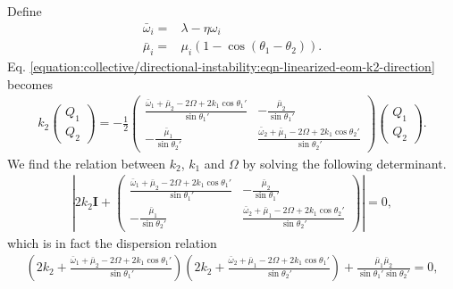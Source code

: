 \documentclass[letterpaper,12pt,english]{sphinxmanual}
\begin{document}
Define
\begin{equation*}
\begin{split}\bar\omega_i =& \lambda - \eta\omega_i\\
\bar\mu_i =& \mu_i(1-\cos(\theta_1-\theta_2)).\end{split}
\end{equation*}
Eq. \eqref{equation:collective/directional-instability:eqn-linearized-eom-k2-direction} becomes
\begin{equation*}
\begin{split}k_2 \begin{pmatrix}
Q_1 \\
Q_2
\end{pmatrix} =-\frac{1}{2}\begin{pmatrix}
\frac{\bar\omega_1 + \bar\mu_2-2\Omega+2k_1\cos\theta_1'}{\sin\theta_1'} & -\frac{\bar\mu_2}{\sin\theta_1'} \\
-\frac{\bar\mu_1}{\sin\theta_2'} & \frac{ \bar\omega_2+\bar\mu_1-2\Omega + 2k_1\cos\theta_2' }{\sin\theta_2'}
\end{pmatrix}\begin{pmatrix}
Q_1 \\
Q_2
\end{pmatrix}.\end{split}
\end{equation*}
We find the relation between \(k_2\), \(k_1\) and \(\Omega\) by solving the following determinant.
\begin{equation*}
\begin{split}\left| 2 k_2 \mathbf I +  \begin{pmatrix}
\frac{\bar\omega_1 + \bar\mu_2-2\Omega+2k_1\cos\theta_1'}{\sin\theta_1'} & -\frac{\bar\mu_2}{\sin\theta_1'} \\
-\frac{\bar\mu_1}{\sin\theta_2'} & \frac{ \bar\omega_2+\bar\mu_1-2\Omega + 2k_1\cos\theta_2' }{\sin\theta_2'}
\end{pmatrix} \right| = 0,\end{split}
\end{equation*}
which is in fact the dispersion relation
\begin{equation*}
\begin{split}\left(2k_2 + \frac{\bar\omega_1 + \bar\mu_2 -2\Omega +2k_1\cos\theta_1'}{\sin\theta_1'} \right) \left( 2k_2 + \frac{\bar\omega_2+\bar\mu_1 - 2\Omega + 2k_1\cos\theta_1'}{\sin\theta_2'} \right) + \frac{\bar\mu_1\bar\mu_2}{\sin\theta_1'\sin\theta_2'} =0,\end{split}
\end{equation*}
\end{document}
